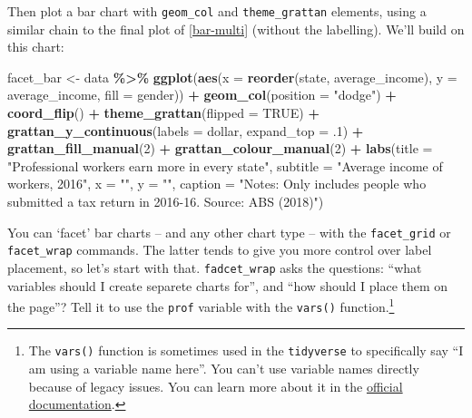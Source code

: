 \documentclass[
]{book}
\newenvironment{Shaded}{\begin{snugshade}}{\end{snugshade}}
\newcommand{\DataTypeTok}[1]{\textcolor[rgb]{0.13,0.29,0.53}{#1}}
\newcommand{\DecValTok}[1]{\textcolor[rgb]{0.00,0.00,0.81}{#1}}
\newcommand{\FloatTok}[1]{\textcolor[rgb]{0.00,0.00,0.81}{#1}}
\newcommand{\KeywordTok}[1]{\textcolor[rgb]{0.13,0.29,0.53}{\textbf{#1}}}
\newcommand{\NormalTok}[1]{#1}
\newcommand{\OperatorTok}[1]{\textcolor[rgb]{0.81,0.36,0.00}{\textbf{#1}}}
\newcommand{\OtherTok}[1]{\textcolor[rgb]{0.56,0.35,0.01}{#1}}
\newcommand{\StringTok}[1]{\textcolor[rgb]{0.31,0.60,0.02}{#1}}
\begin{document}
Then plot a bar chart with \texttt{geom\_col} and \texttt{theme\_grattan} elements, using a similar chain to the final plot of \ref{bar-multi} (without the labelling). We'll build on this chart:

\begin{Shaded}
\begin{Highlighting}[]
\NormalTok{facet\_bar \textless{}{-}}\StringTok{ }\NormalTok{data }\OperatorTok{\%\textgreater{}\%}\StringTok{ }
\StringTok{  }\KeywordTok{ggplot}\NormalTok{(}\KeywordTok{aes}\NormalTok{(}\DataTypeTok{x =} \KeywordTok{reorder}\NormalTok{(state, average\_income),}
             \DataTypeTok{y =}\NormalTok{ average\_income,}
             \DataTypeTok{fill =}\NormalTok{ gender)) }\OperatorTok{+}\StringTok{ }
\StringTok{  }\KeywordTok{geom\_col}\NormalTok{(}\DataTypeTok{position =} \StringTok{"dodge"}\NormalTok{) }\OperatorTok{+}\StringTok{ }
\StringTok{  }\KeywordTok{coord\_flip}\NormalTok{() }\OperatorTok{+}\StringTok{ }
\StringTok{  }\KeywordTok{theme\_grattan}\NormalTok{(}\DataTypeTok{flipped =} \OtherTok{TRUE}\NormalTok{) }\OperatorTok{+}\StringTok{ }
\StringTok{  }\KeywordTok{grattan\_y\_continuous}\NormalTok{(}\DataTypeTok{labels =}\NormalTok{ dollar, }
                       \DataTypeTok{expand\_top =} \FloatTok{.1}\NormalTok{) }\OperatorTok{+}\StringTok{ }
\StringTok{  }\KeywordTok{grattan\_fill\_manual}\NormalTok{(}\DecValTok{2}\NormalTok{) }\OperatorTok{+}\StringTok{ }
\StringTok{  }\KeywordTok{grattan\_colour\_manual}\NormalTok{(}\DecValTok{2}\NormalTok{) }\OperatorTok{+}\StringTok{ }
\StringTok{  }\KeywordTok{labs}\NormalTok{(}\DataTypeTok{title =} \StringTok{"Professional workers earn more in every state"}\NormalTok{,}
       \DataTypeTok{subtitle =} \StringTok{"Average income of workers, 2016"}\NormalTok{,}
       \DataTypeTok{x =} \StringTok{""}\NormalTok{,}
       \DataTypeTok{y =} \StringTok{""}\NormalTok{,}
       \DataTypeTok{caption =} \StringTok{"Notes: Only includes people who submitted a tax return in 2016{-}16. Source: ABS (2018)"}\NormalTok{)}
\end{Highlighting}
\end{Shaded}

You can `facet' bar charts -- and any other chart type -- with the \texttt{facet\_grid} or \texttt{facet\_wrap} commands. The latter tends to give you more control over label placement, so let's start with that. \texttt{fadcet\_wrap} asks the questions: ``what variables should I create separete charts for'', and ``how should I place them on the page''? Tell it to use the \texttt{prof} variable with the \texttt{vars()} function.\footnote{The \texttt{vars()} function is sometimes used in the \texttt{tidyverse} to specifically say ``I am using a variable name here''. You can't use variable names directly because of legacy issues. You can learn more about it in the \href{https://ggplot2.tidyverse.org/reference/facet_wrap.html}{official documentation}.}
\end{document}
